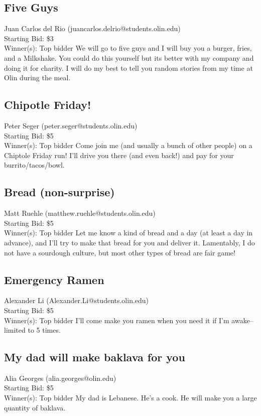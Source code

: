 \documentclass[11pt]{article}
\begin{document}
\subsection{Five Guys }
Juan Carlos del Rio (juancarlos.delrio@students.olin.edu) \\
Starting Bid: \$3 \\
Winner(s): 
Top bidder\newline
We will go to five guys and I will buy you a burger, fries, and a Milkshake. You could do this yourself but its better with my company and doing it for charity. I will do my best to tell you random stories from my time at Olin during the meal.
\subsection{Chipotle Friday!}
Peter Seger (peter.seger@students.olin.edu) \\
Starting Bid: \$5 \\
Winner(s): 
Top bidder\newline
Come join me (and usually a bunch of other people) on a Chiptole Friday run! I'll drive you there (and even back!) and pay for your burrito/tacos/bowl.
\subsection{Bread (non-surprise) }
Matt Ruehle  (matthew.ruehle@students.olin.edu) \\
Starting Bid: \$5 \\
Winner(s): 
Top bidder\newline
Let me know a kind of bread and a day (at least a day in advance), and I'll try to make that bread for you and deliver it. Lamentably, I do not have a sourdough culture, but most other types of bread are fair game!
\subsection{Emergency Ramen}
Alexander Li (Alexander.Li@students.olin.edu) \\
Starting Bid: \$5 \\
Winner(s): 
Top bidder\newline
I'll come make you ramen when you need it if I'm awake-- limited to 5 times.
\subsection{My dad will make baklava for you}
Alia Georges (alia.georges@olin.edu) \\
Starting Bid: \$5 \\
Winner(s): 
Top bidder\newline
My dad is Lebanese. He's a cook. He will make you a large quantity of baklava.
\end{document}
